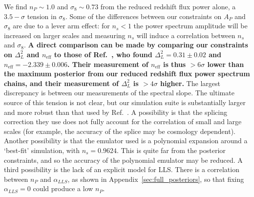 We find $n_P \sim 1.0$ and $\sigma_8 \sim 0.73$ from the reduced redshift flux power alone, a $3.5-\sigma$ tension in $\sigma_8$. Some of the differences between our constraints on $A_P$ and $\sigma_8$ are due to a lever arm effect: for $n_s < 1$ the power spectrum amplitude will be increased on larger scales and measuring $n_s$ will induce a correlation between $n_s$ and $\sigma_8$. \textbf{A direct comparison can be made by comparing our constraints on $\Delta_L^2$ and $n_\mathrm{eff}$ to those of Ref.~\cite{2019JCAP...07..017C}, who found $\Delta_L^2 = 0.31 \pm 0.02$ and $n_\mathrm{eff} = -2.339 \pm 0.006$. Their measurement of $n_\mathrm{eff}$ is thus $ > 6 \sigma$ lower than the maximum posterior from our reduced redshift flux power spectrum chains, and their measurement of $\Delta_L^2$ is $ > 4\sigma$ higher.}
The largest discrepancy is between our measurements of the spectral slope. The ultimate source of this tension is not clear, but our simulation suite is substantially larger and more robust than that used by Ref.~\cite{2020JCAP...04..038P}. A possibility is that the splicing correction they use does not fully account for the correlation of small and large scales (for example, the accuracy of the splice may be cosmology dependent). Another possibility is that the emulator used is a polynomial expansion around a `best-fit' simulation, with $n_s = 0.9624$. This is quite far from the posterior constraints, and so the accuracy of the polynomial emulator may be reduced. A third possibility is the lack of an explicit model for LLS. There is a correlation between $n_P$ and $\alpha_{LLS}$, as shown in Appendix~\ref{sec:full_posteriors}, so that fixing $\alpha_{LLS} = 0$ could produce a low $n_P$.



